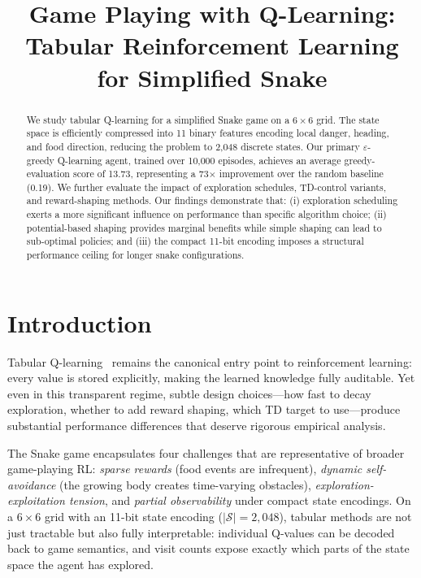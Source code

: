\documentclass[10pt,conference]{IEEEtran}
\title{Game Playing with Q-Learning:\\
Tabular Reinforcement Learning for Simplified Snake}
\author{
  \IEEEauthorblockN{Group 999 --- Track A: Game Playing with Q-Learning}
  \IEEEauthorblockA{\textit{Anyi Wang, Junyi He, Yuqi Zhu, Yuqi Ren} \\
  Reinforcement Learning Course Final Project, 2026}
}
\begin{document}
\maketitle

\begin{abstract}
We study tabular Q-learning for a simplified Snake game on a $6{\times}6$ grid. The state space is efficiently compressed into 11 binary features encoding local danger, heading, and food direction, reducing the problem to 2,048 discrete states. Our primary $\varepsilon$-greedy Q-learning agent, trained over 10{,}000 episodes, achieves an average greedy-evaluation score of 13.73, representing a 73$\times$ improvement over the random baseline (0.19). We further evaluate the impact of exploration schedules, TD-control variants, and reward-shaping methods.  Our findings demonstrate that: (i) exploration scheduling exerts a more significant influence on performance than specific algorithm choice; (ii) potential-based shaping provides marginal benefits while simple shaping can lead to sub-optimal policies; and (iii) the compact 11-bit encoding imposes a structural performance ceiling for longer snake configurations. 
\end{abstract}

\section{Introduction}
\label{sec:intro}

Tabular Q-learning~\cite{watkins1992q} remains the canonical entry
point to reinforcement learning: every value is stored explicitly,
making the learned knowledge fully auditable.
Yet even in this transparent regime, subtle design choices---how fast
to decay exploration, whether to add reward shaping, which TD target
to use---produce substantial performance differences that deserve
rigorous empirical analysis.

The Snake game encapsulates four challenges that are representative
of broader game-playing RL:
\emph{sparse rewards} (food events are infrequent),
\emph{dynamic self-avoidance} (the growing body creates
time-varying obstacles),
\emph{exploration-exploitation tension}, and
\emph{partial observability} under compact state encodings.
On a $6{\times}6$ grid with an 11-bit state encoding
($|\mathcal{S}|=2{,}048$), tabular methods are not just
tractable but also fully interpretable: individual Q-values can be
decoded back to game semantics, and visit counts expose exactly
which parts of the state space the agent has explored.
\end{document}
